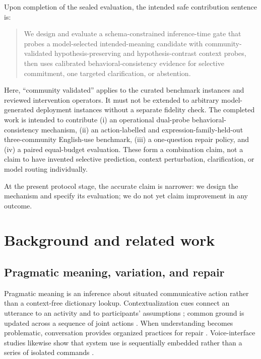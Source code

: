 \documentclass[preprint,12pt,authoryear]{elsarticle}
\begin{document}
Upon completion of the sealed evaluation, the intended safe contribution
sentence is:

\begin{quote}
We design and evaluate a schema-constrained inference-time gate that probes a
model-selected intended-meaning candidate with community-validated
hypothesis-preserving and hypothesis-contrast context probes, then uses
calibrated behavioral-consistency evidence for selective commitment, one
targeted clarification, or abstention.
\end{quote}

Here, ``community validated'' applies to the curated benchmark instances and
reviewed intervention operators. It must not be extended to arbitrary model-
generated deployment instances without a separate fidelity check. The
completed work is intended to contribute (i) an operational dual-probe
behavioral-consistency mechanism, (ii) an action-labelled and expression-family-held-out
three-community English-use benchmark, (iii) a one-question repair policy, and (iv) a paired
equal-budget evaluation. These form a combination claim, not a claim to have
invented selective prediction, context perturbation, clarification, or model
routing individually.

At the present protocol stage, the accurate claim is narrower: we design the
mechanism and specify its evaluation; we do not yet claim improvement in any
outcome.

\section{Background and related work}

\subsection{Pragmatic meaning, variation, and repair}

Pragmatic meaning is an inference about situated communicative action rather
than a context-free dictionary lookup. Contextualization cues connect an
utterance to an activity and to participants' assumptions
\citep{gumperz1982discourse}; common ground is updated across a sequence of
joint actions \citep{clark1996using}. When understanding becomes problematic,
conversation provides organized practices for repair
\citep{schegloff1977repair}. Voice-interface studies likewise show that system
use is sequentially embedded rather than a series of isolated commands
\citep{porcheron2018voice}.
\end{document}
